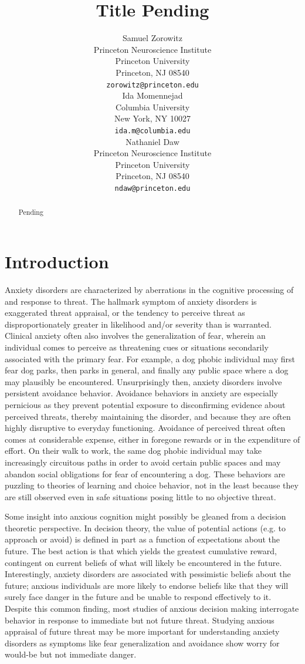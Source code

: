 \documentclass[11pt]{article} %
\title{Title Pending}
\author{
Samuel Zorowitz \\
Princeton Neuroscience Institute\\
Princeton University\\
Princeton, NJ 08540 \\
\texttt{zorowitz@princeton.edu} \\
\And
Ida Momennejad \\
Columbia University\\
New York, NY 10027 \\
\texttt{ida.m@columbia.edu} \\
\And
Nathaniel Daw \\
Princeton Neuroscience Institute\\
Princeton University\\
Princeton, NJ 08540 \\
\texttt{ndaw@princeton.edu} \\
}
\begin{document}
\maketitle

\begin{abstract}
Pending
\end{abstract}


\startmain

\section{Introduction}

Anxiety disorders are characterized by aberrations in the cognitive processing of and response to threat. The hallmark symptom of anxiety disorders is exaggerated threat appraisal, or the tendency to perceive threat as disproportionately greater in likelihood and/or severity than is warranted. Clinical anxiety often also involves the generalization of fear, wherein an individual comes to perceive as threatening cues or situations secondarily associated with the primary fear. For example, a dog phobic individual may first fear dog parks, then parks in general, and finally any public space where a dog may plausibly be encountered. Unsurprisingly then, anxiety disorders involve persistent avoidance behavior. Avoidance behaviors in anxiety are especially pernicious as they prevent potential exposure to disconfirming evidence about perceived threats, thereby maintaining the disorder, and because they are often highly disruptive to everyday functioning. Avoidance of perceived threat often comes at considerable expense, either in foregone rewards or in the expenditure of effort. On their walk to work, the same dog phobic individual may take increasingly circuitous paths in order to avoid certain public spaces and may abandon social obligations for fear of encountering a dog. These behaviors are puzzling to theories of learning and choice behavior, not in the least because they are still observed even in safe situations posing little to no objective threat.

Some insight into anxious cognition might possibly be gleaned from a decision theoretic perspective. In decision theory, the value of potential actions (e.g. to approach or avoid) is defined in part as a function of expectations about the future. The best action is that which yields the greatest cumulative reward, contingent on current beliefs of what will likely be encountered in the future. Interestingly, anxiety disorders are associated with pessimistic beliefs about the future; anxious individuals are more likely to endorse beliefs like that they will surely face danger in the future and be unable to respond effectively to it. Despite this common finding, most studies of anxious decision making interrogate behavior in response to immediate but not future threat. Studying anxious appraisal of future threat may be more important for understanding anxiety disorders as symptoms like fear generalization and avoidance show worry for would-be but not immediate danger.
\end{document}
